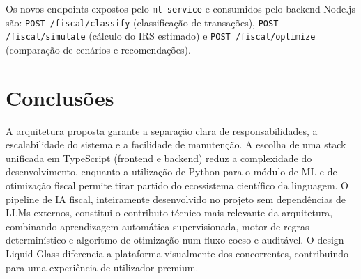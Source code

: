 Os novos endpoints expostos pelo \texttt{ml-service} e consumidos pelo backend Node.js são: \texttt{POST /fiscal/classify} (classificação de transações), \texttt{POST /fiscal/simulate} (cálculo do \ac{IRS} estimado) e \texttt{POST /fiscal/optimize} (comparação de cenários e recomendações).


\section{Conclusões}
\label{sec:arq-conclusoes}

A arquitetura proposta garante a separação clara de responsabilidades, a escalabilidade do sistema e a facilidade de manutenção. A escolha de uma stack unificada em TypeScript (frontend e backend) reduz a complexidade do desenvolvimento, enquanto a utilização de Python para o módulo de \ac{ML} e de otimização fiscal permite tirar partido do ecossistema científico da linguagem. O pipeline de \ac{IA} fiscal, inteiramente desenvolvido no projeto sem dependências de \ac{LLM}s externos, constitui o contributo técnico mais relevante da arquitetura, combinando aprendizagem automática supervisionada, motor de regras determinístico e algoritmo de otimização num fluxo coeso e auditável. O design Liquid Glass diferencia a plataforma visualmente dos concorrentes, contribuindo para uma experiência de utilizador premium.
